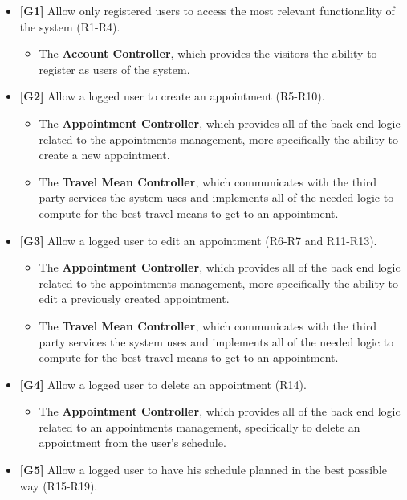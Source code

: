 \documentclass[12pt]{article}
\begin{document}
\begin{itemize}
    \item \textbf{{[G1]}} Allow only registered users to access the most relevant functionality of the system (R1-R4).
    \begin{itemize}
        \item The \textbf{Account Controller}, which provides the visitors the ability to register as users of the system.
    \end{itemize}
    \item \textbf{{[G2]}} Allow a logged user to create an appointment (R5-R10).
    \begin{itemize}
        \item The \textbf{Appointment Controller}, which provides all of the back end logic related to the appointments management, more specifically the ability to create a new appointment.
        \item The \textbf{Travel Mean Controller}, which communicates with the third party services the system uses and implements all of the needed logic to compute for the best travel means to get to an appointment.
    \end{itemize}
    \item \textbf{{[G3]}} Allow a logged user to edit an appointment (R6-R7 and R11-R13).
    \begin{itemize}
        \item The \textbf{Appointment Controller}, which provides all of the back end logic related to the appointments management, more specifically the ability to edit a previously created appointment.
        \item The \textbf{Travel Mean Controller}, which communicates with the third party services the system uses and implements all of the needed logic to compute for the best travel means to get to an appointment.
    \end{itemize}
    \item \textbf{{[G4]}} Allow a logged user to delete an appointment (R14).
    \begin{itemize}
        \item The \textbf{Appointment Controller}, which provides all of the back end logic related to an appointments management, specifically to delete an appointment from the user's schedule.
    \end{itemize}
    \item \textbf{{[G5]}} Allow a logged user to have his schedule planned in the best possible way (R15-R19).
    \begin{itemize}

\end{itemize}
\end{itemize}
\end{document}
